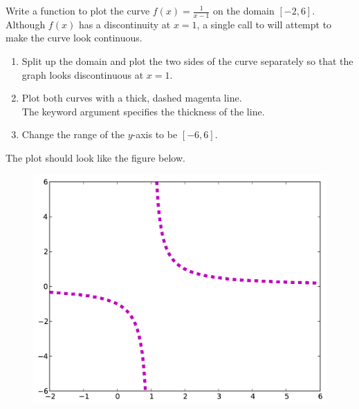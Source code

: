 \begin{problem} %
\label{prob:lineplot}
Write a function to plot the curve $f(x) = \frac{1}{x-1}$ on the domain $[-2,6]$.
Although $f(x)$ has a discontinuity at $x=1$, a single call to  will attempt to make the curve look continuous.
\begin{enumerate}
\item Split up the domain and plot the two sides of the curve separately so that the graph looks discontinuous at $x=1$.
\item Plot both curves with a thick, dashed magenta line.\\
The keyword argument  specifies the thickness of the line.
\item Change the range of the $y$-axis to be $[-6, 6]$.
\end{enumerate}
The plot should look like the figure below.

\begin{figure}[H]
\includegraphics[width=.7\textwidth]{soln2.pdf}
\end{figure}
\end{problem}

